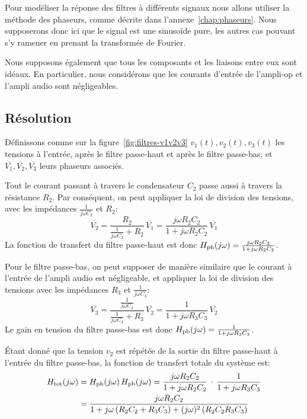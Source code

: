 Pour modéliser la réponse des filtres à différents signaux nous allons utiliser
la méthode des phaseurs, comme décrite dans l'annexe~\ref{chap:phaseurs}.
Nous supposerons donc ici que le signal est une sinusoïde pure, les autres cas
pouvant s'y ramener en prenant la transformée de Fourier.

Nous supposons également que tous les composants et les liaisons entre eux
sont idéaux.
En particulier, nous considérons que les courants d'entrée de l'ampli-op
et l'ampli audio sont négligeables.

\subsection{Résolution}

Définissons comme sur la figure~\ref{fig:filtres-v1v2v3}
$v_1(t),v_2(t),v_3(t)$ les tensions
à l'entrée, après le filtre passe-haut et après le filtre passe-bas;
et $\overline{V_1}, \overline{V_2}, \overline{V_3}$ leurs phaseurs associés.

Tout le courant passant à travers le condensateur $C_2$ passe
aussi à travers la résistance $R_2$.
Par conséquent, on peut appliquer la loi de division des tensions,
avec les impédances $\frac{1}{j\omega C_2}$ et $R_2$:
\begin{equation}
    \overline{V_2} = \frac{R_2}{\frac{1}{j\omega C_2} + R_2}\,\overline{V_1}
    = \frac{j\omega R_2C_2}{1+j\omega R_2C_2}\,\overline{V_1}
\end{equation}
La fonction de transfert du filtre passe-haut est donc
$H_{\mathrm{ph}}(j\omega) = \frac{j\omega R_2C_2}{1+j\omega R_2C_2}$.

Pour le filtre passe-bas, on peut supposer de manière similaire que
le courant à l'entrée de l'ampli audio est négligeable,
et appliquer la loi de division des tensions avec les impédances
$R_3$ et $\frac{1}{j\omega C_3}$:
\begin{equation}
    \overline{V_3} =
    \frac{\frac{1}{j\omega C_3}}{\frac{1}{j\omega C_3} + R_3}\,\overline{V_2}
    = \frac{1}{1+j\omega R_3C_3}\,\overline{V_2}
\end{equation}
Le gain en tension du filtre passe-bas est donc
$H_{\mathrm{pb}}(j\omega) = \frac{1}{1 + j\omega R_3C_3}$.

Étant donné que la tension $v_2$ est répétée de la sortie du filtre passe-haut
à l'entrée du filtre passe-bas, la fonction de transfert totale du système est:
\begin{align}
    H_{\mathrm{tot}}(j\omega) &= H_{\mathrm{ph}}(j\omega)\,H_{\mathrm{pb}}(j\omega) =
    \frac{j\omega R_2C_2}{1 + j\omega R_2C_2}\,\cdot\,
    \frac{1}{1 + j\omega R_3C_3}\\
    &= \frac{j\omega R_2C_2}{1 + j\omega\,(R_2C_2+R_3C_3) +
        (j\omega)^2\,(R_2C_2R_3C_3)}
\end{align}

